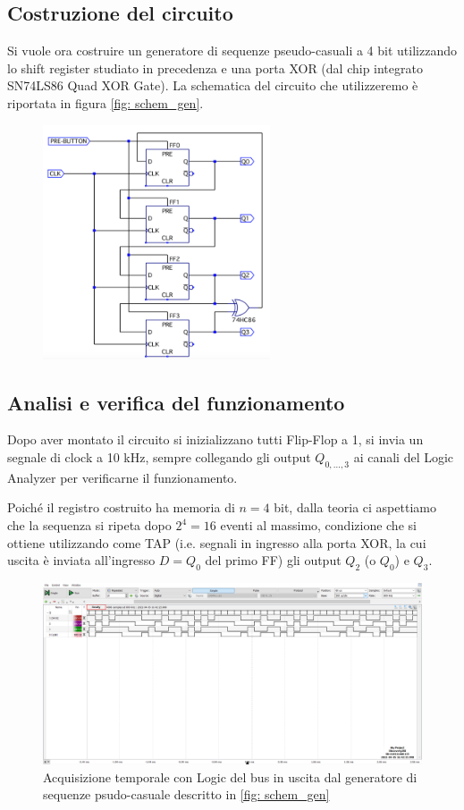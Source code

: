 \documentclass[10pt, a4paper, italian]{article}
\begin{document}
\subsection{Costruzione del circuito}
Si vuole ora costruire un generatore di sequenze pseudo-casuali a 4 bit
utilizzando lo shift register studiato in precedenza e una porta XOR (dal chip
integrato SN74LS86 Quad XOR Gate).
La schematica del circuito che utilizzeremo è riportata in figura
\cref{fig: schem_gen}.
\begin{figure}[htbp]
\centering
	\includegraphics[width=0.6\textwidth]{schem_gen}
\end{figure}

\subsection{Analisi e verifica del funzionamento}
Dopo aver montato il circuito si inizializzano tutti Flip-Flop a 1, si invia
un segnale di clock a 10 kHz, sempre collegando gli output $Q_{0,\ldots, 3}$
ai canali del Logic Analyzer per verificarne il funzionamento.

Poiché il registro costruito ha memoria di $n = 4$ bit, dalla teoria ci
aspettiamo che la sequenza si ripeta dopo $2^4 = 16$ eventi al massimo,
condizione che si ottiene utilizzando come TAP (i.e. segnali in ingresso alla
porta XOR, la cui uscita è inviata all'ingresso $D = Q_0$ del primo FF) gli
output $Q_2$ (o $Q_0$) e $Q_3$.
\begin{figure}[htbp]
\centering
	\includegraphics[width=\textwidth]{4.b}
	\caption{Acquisizione temporale con Logic del bus in uscita dal generatore
	di sequenze psudo-casuale descritto in \cref{fig: schem_gen}
	\label{fig: TAP_23}}
\end{figure}
\end{document}
